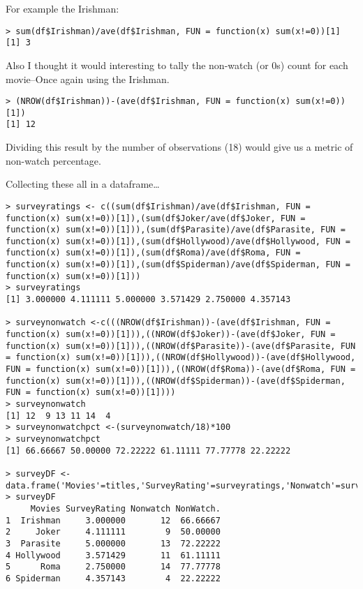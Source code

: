 \documentclass[
]{article}
\begin{document}
For example the Irishman:

\begin{verbatim}
> sum(df$Irishman)/ave(df$Irishman, FUN = function(x) sum(x!=0))[1]
[1] 3
\end{verbatim}

Also I thought it would interesting to tally the non-watch (or 0s) count
for each movie--Once again using the Irishman.

\begin{verbatim}
> (NROW(df$Irishman))-(ave(df$Irishman, FUN = function(x) sum(x!=0))[1])
[1] 12
\end{verbatim}

Dividing this result by the number of observations (18) would give us a
metric of non-watch percentage.

Collecting these all in a dataframe\ldots{}

\begin{verbatim}
> surveyratings <- c((sum(df$Irishman)/ave(df$Irishman, FUN = function(x) sum(x!=0))[1]),(sum(df$Joker/ave(df$Joker, FUN = function(x) sum(x!=0))[1])),(sum(df$Parasite)/ave(df$Parasite, FUN = function(x) sum(x!=0))[1]),(sum(df$Hollywood)/ave(df$Hollywood, FUN = function(x) sum(x!=0))[1]),(sum(df$Roma)/ave(df$Roma, FUN = function(x) sum(x!=0))[1]),(sum(df$Spiderman)/ave(df$Spiderman, FUN = function(x) sum(x!=0))[1]))
> surveyratings
[1] 3.000000 4.111111 5.000000 3.571429 2.750000 4.357143

> surveynonwatch <-c(((NROW(df$Irishman))-(ave(df$Irishman, FUN = function(x) sum(x!=0))[1])),((NROW(df$Joker))-(ave(df$Joker, FUN = function(x) sum(x!=0))[1])),((NROW(df$Parasite))-(ave(df$Parasite, FUN = function(x) sum(x!=0))[1])),((NROW(df$Hollywood))-(ave(df$Hollywood, FUN = function(x) sum(x!=0))[1])),((NROW(df$Roma))-(ave(df$Roma, FUN = function(x) sum(x!=0))[1])),((NROW(df$Spiderman))-(ave(df$Spiderman, FUN = function(x) sum(x!=0))[1])))
> surveynonwatch
[1] 12  9 13 11 14  4
> surveynonwatchpct <-(surveynonwatch/18)*100
> surveynonwatchpct 
[1] 66.66667 50.00000 72.22222 61.11111 77.77778 22.22222

> surveyDF <- data.frame('Movies'=titles,'SurveyRating'=surveyratings,'Nonwatch'=surveynonwatch,'NonWatch%'=surveynonwatchpct)
> surveyDF
     Movies SurveyRating Nonwatch NonWatch.
1  Irishman     3.000000       12  66.66667
2     Joker     4.111111        9  50.00000
3  Parasite     5.000000       13  72.22222
4 Hollywood     3.571429       11  61.11111
5      Roma     2.750000       14  77.77778
6 Spiderman     4.357143        4  22.22222
\end{verbatim}
\end{document}
